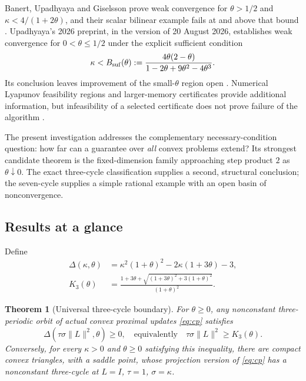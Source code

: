 \documentclass[11pt]{article}
\newtheorem{theorem}{Theorem}[section]
\theoremstyle{remark}\newtheorem{remark}[theorem]{Remark}
\newcommand{\norm}[1]{\lVert #1\rVert}
\newcommand{\boundary}{K_3}
\begin{document}
Banert, Upadhyaya and Giselsson prove weak convergence for $\theta>1/2$ and $\kappa<4/(1+2\theta)$, and their scalar bilinear example fails at and above that bound \cite{BUG}. Upadhyaya's 2026 preprint, in the version of 20 August 2026, establishes weak convergence for $0<\theta\le1/2$ under the explicit sufficient condition
\begin{equation}\label{eq:known}
 \kappa< B_{\rm suf}(\theta):=
 \frac{4\theta(2-\theta)}{1-2\theta+9\theta^2-4\theta^3}.
\end{equation}
Its conclusion leaves improvement of the small-$\theta$ region open \cite{U26}. Numerical Lyapunov feasibility regions and larger-memory certificates provide additional information, but infeasibility of a selected certificate does not prove failure of the algorithm \cite{AutoTight,AutoLyap}.

The present investigation addresses the complementary necessary-condition question: how far can a guarantee over \emph{all} convex problems extend? Its strongest candidate theorem is the fixed-dimension family approaching step product $2$ as $\theta\downarrow0$. The exact three-cycle classification supplies a second, structural conclusion; the seven-cycle supplies a simple rational example with an open basin of nonconvergence.

\subsection{Results at a glance}

Define
\begin{align}
 \Delta(\kappa,\theta)&=\kappa^2(1+\theta)^2-2\kappa(1+3\theta)-3,\label{eq:delta}\\
 \boundary(\theta)&=
 \frac{1+3\theta+\sqrt{(1+3\theta)^2+3(1+\theta)^2}}{(1+\theta)^2}.
 \label{eq:kthree}
\end{align}

\begin{theorem}[Universal three-cycle boundary]\label{thm:three}
For $\theta\ge0$, any nonconstant three-periodic orbit of actual convex proximal updates \eqref{eq:cp} satisfies
\[
 \Delta(\tau\sigma\norm{L}^2,\theta)\ge0,
 \quad\text{equivalently}\quad \tau\sigma\norm{L}^2\ge\boundary(\theta).
\]
Conversely, for every $\kappa>0$ and $\theta\ge0$ satisfying this inequality, there are compact convex triangles, with a saddle point, whose projection version of \eqref{eq:cp} has a nonconstant three-cycle at $L=I$, $\tau=1$, $\sigma=\kappa$.
\end{theorem}
\end{document}
